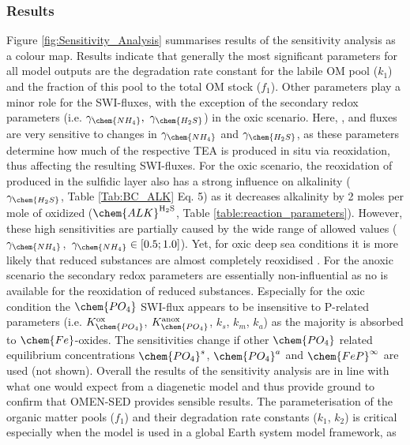 \documentclass[gmd, manuscript]{copernicus}
\begin{document}
\subsubsection{Results}
Figure \ref{fig:Sensitivity_Analysis} summarises results of the sensitivity analysis as a colour map. 
Results indicate that generally the most significant parameters for all model outputs are the degradation rate constant for the labile OM pool ($k_1$) and the fraction of this pool to the total OM stock ($f_1$). 
Other parameters play a minor role for the SWI-fluxes, with the exception of the secondary redox parameters (i.e. $\gamma_\chem{NH_4},\ \gamma_\chem{H_2S}$) in the oxic scenario.
Here, ,  and  fluxes are very sensitive to changes in $\gamma_\chem{NH_4}$ and $\gamma_\chem{H_2S}$, as these parameters determine how much of the respective TEA is produced in situ via reoxidation, 
thus affecting the resulting SWI-fluxes. 
For the oxic scenario, the reoxidation of  produced in the sulfidic layer also has a strong influence on alkalinity ($\gamma_\chem{H_2S}$, Table \ref{Tab:BC_ALK} Eq. 5) 
as it decreases alkalinity by 2 moles per mole of  oxidized ($\chem{ALK}^\mathrm{H_2S}$, Table \ref{table:reaction_parameters}). 
However, these high sensitivities are partially caused by the wide range of allowed values ($\gamma_{\chem{NH_4}}$,\ $\gamma_{\chem{NH_4}} \in [0.5; 1.0]$). Yet, for oxic deep sea conditions it is more
likely that reduced substances are almost completely reoxidised \citep[e.g.][]{hensen_benthic_2006}. 
For the anoxic scenario the secondary redox parameters are essentially non-influential as no  is available for the reoxidation of reduced substances. 
Especially for the oxic condition the $\chem{PO_4}$ SWI-flux appears to be insensitive to P-related parameters (i.e. $K_\chem{PO_4}^\mathrm{ox}$, $K_\chem{PO_4}^\mathrm{anox}$, $k_s$, $k_m$, $k_a$) as the majority is absorbed to $\chem{Fe}$-oxides. 
The sensitivities change if other $\chem{PO_4}$ related equilibrium concentrations $\chem{PO_4}^s$, $\chem{PO_4}^a$ and $\chem{FeP}^\infty$ are used (not shown).
Overall the results of the sensitivity analysis are in line with what one would expect from a diagenetic model and thus provide ground to confirm that OMEN-SED provides sensible results.
The parameterisation of the organic matter pools ($f_1$) and their degradation rate constants ($k_1$, $k_2$) is critical especially when the model is used in a global Earth system model framework, as 
\end{document}
